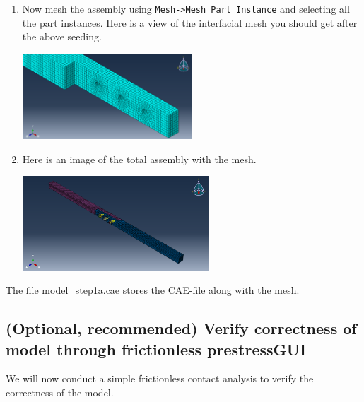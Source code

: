 \documentclass[11pt]{article}
\begin{document}
\begin{enumerate}
\begin{center}
\end{center}
\item Now mesh the assembly using \texttt{Mesh->Mesh Part Instance} and selecting all the part instances.
Here is a view of the interfacial mesh you should get after the above seeding.
\begin{center}
\includegraphics[width=0.5\textwidth]{./figs/mesh.png}
\end{center}
\item Here is an image of the total assembly with the mesh.
\begin{center}
\includegraphics[width=0.55\textwidth]{./figs/fullmesh.png}
\end{center}
\end{enumerate}

The file \href{https://github.com/Nidish96/Abaqus4Joints/blob/main/assets/assembly/model\_step1a.cae}{model\_step1a.cae} stores the CAE-file along with the mesh.
\subsection{(Optional, recommended) Verify correctness of model through frictionless prestress\hfill{}\textsc{GUI}}
\label{sec:abqprs}
We will now conduct a simple frictionless contact analysis to verify the correctness of the model.
\end{document}

